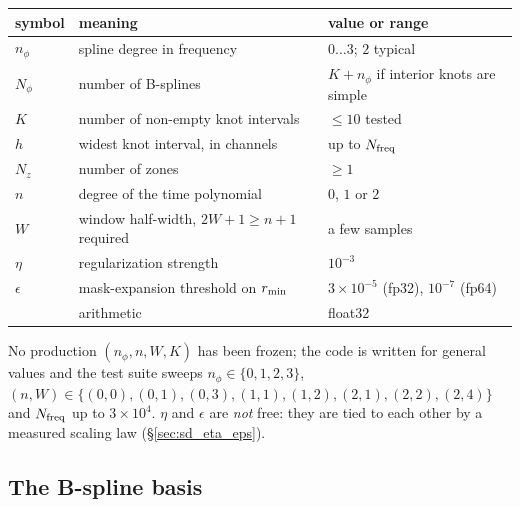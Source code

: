 \documentclass{article}
\numberwithin{equation}{section}   %
\begin{document}
\begin{center}
\small
\begin{tabular}{lll}
\toprule
symbol & meaning & value or range \\
\midrule
$n_\phi$   & spline degree in frequency                        & $0 \ldots 3$; $2$ typical \\
$N_\phi$   & number of B-splines                               & $K + n_\phi$ if interior knots are simple \\
$K$        & number of non-empty knot intervals                & $\le 10$ tested \\
$h$        & widest knot interval, in channels                 & up to $N_{\rm freq}$ \\
$N_z$      & number of zones                                   & $\ge 1$ \\
$n$        & degree of the time polynomial                     & $0$, $1$ or $2$ \\
$W$        & window half-width, $2W{+}1 \ge n{+}1$ required    & a few samples \\
$\eta$     & regularization strength                           & $10^{-3}$ \\
$\epsilon$ & mask-expansion threshold on $r_{\rm min}$         & $3\times10^{-5}$ (fp32), $10^{-7}$ (fp64) \\
           & arithmetic                                        & float32 \\
\bottomrule
\end{tabular}
\end{center}
No production $(n_\phi, n, W, K)$ has been frozen; the code is written for general values and the test suite
sweeps $n_\phi \in \{0,1,2,3\}$, $(n,W) \in \{(0,0),(0,1),(0,3),(1,1),(1,2),(2,1),(2,2),(2,4)\}$ and
$N_{\rm freq}$ up to $3\times10^4$.  $\eta$ and $\epsilon$ are {\em not} free: they are tied to each other by a
measured scaling law (\S\ref{sec:sd_eta_eps}).

\subsection{The B-spline basis}
\label{sec:sd_basis}
\end{document}
